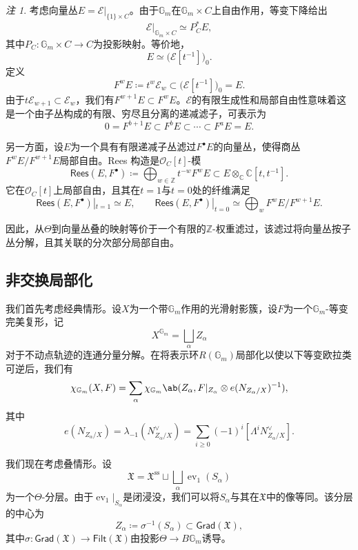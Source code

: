 \documentclass{amsart}
\theoremstyle{definition}
\theoremstyle{remark}
\newtheorem{rmk}[thm]{注}
\theoremstyle{plain}
\theoremstyle{definition}
\theoremstyle{remark}
\newcommand{\G}{\mathbb{G}}
\newcommand{\C}{\mathbb{C}}
\newcommand{\Z}{\mathbb{Z}}
\newcommand{\mc}[1]{\mathcal{#1}}
\newcommand{\mf}[1]{\mathfrak{#1}}
\newcommand{\mr}[1]{\mathrm{#1}}
\newcommand{\ms}[1]{\mathsf{#1}}
\newcommand{\1}{\mathbf{1}}
\newcommand{\2}{\mathbf{2}}
\newcommand{\3}{\mathbf{3}}
\DeclareMathOperator{\ev}{ev}
\begin{document}
\begin{rmk}
    考虑向量丛\(E=\mc{E}|_{\{1\}\times C}\)。由于\(\G_m\)在\(\G_m\times C\)上自由作用，等变下降给出
    \[
        \mc{E}|_{\G_m\times C}\simeq P_C^*E,
    \]
    其中\(P_C\colon\G_m\times C\to C\)为投影映射。等价地，
    \[
        E\simeq\big(\mc{E}[t^{-1}]\big)_0.
    \]
    定义
    \[
        F^wE\coloneqq t^w\mc{E}_w\subset\big(\mc{E}[t^{-1}]\big)_0=E.
    \]
    由于\(t\mc{E}_{w+1}\subset\mc{E}_w\)，我们有\(F^{w+1}E\subset F^wE\)。\(\mc{E}\)的有限生成性和局部自由性意味着这是一个由子丛构成的有限、穷尽且分离的递减滤子，可表示为
    \[
        0=F^{b+1}E\subset F^bE\subset\cdots\subset F^aE=E.
    \]

    另一方面，设\(E\)为一个具有有限递减子丛滤过\(F^\bullet E\)的向量丛，使得商丛\(F^wE/F^{w+1}E\)局部自由。Rees 构造是\(\mc{O}_C[t]\)-模
    \[
        \ms{Rees}(E,F^\bullet)
        \coloneqq
        \bigoplus_{w\in\Z}t^{-w}F^wE
        \subset
        E\otimes_{\C}\C[t,t^{-1}].
    \]
    它在\(\mc{O}_C[t]\)上局部自由，且其在\(t=1\)与\(t=0\)处的纤维满足
    \[
        \ms{Rees}(E,F^\bullet)|_{t=1}\simeq E,
        \qquad
        \ms{Rees}(E,F^\bullet)|_{t=0}
        \simeq
        \bigoplus_w F^wE/F^{w+1}E.
    \]
\end{rmk}

因此，从\(\Theta\)到向量丛叠的映射等价于一个有限的\(\Z\)-权重滤过，该滤过将向量丛按子丛分解，且其关联的分次部分局部自由。


\subsection{非交换局部化}%
\label{sub:Non-abelian localization}

我们首先考虑经典情形。设\(X\)为一个带\(\G_m\)作用的光滑射影簇，设\(F\)为一个\(\G_m\)-等变完美复形，记
\[
    X^{\G_m}=\bigsqcup_\alpha Z_\alpha
\]
对于不动点轨迹的连通分量分解。在将表示环\(R(\G_m)\)局部化以使以下等变欧拉类可逆后，我们有
\[
    \chi_{\G_m}(X,F)
    =
    \sum_\alpha
    \chi_{\G_m}\ab(
        Z_\alpha,
        F|_{Z_\alpha}\otimes e(N_{Z_\alpha/X})^{-1}
    ),
\]
其中
\[
    e(N_{Z_\alpha/X})
    =
    \lambda_{-1}(N_{Z_\alpha/X}^\vee)
    =
    \sum_{i\geq0}(-1)^i[\Lambda^iN_{Z_\alpha/X}^\vee].
\]

我们现在考虑叠情形。设
\[
    \mf{X}
    =
    \mf{X}^{\mr{ss}}
    \sqcup
    \bigsqcup_\alpha\ev_1(S_\alpha)
\]
为一个\(\Theta\)-分层。由于\(\ev_1|_{S_\alpha}\)是闭浸没，我们可以将\(S_\alpha\)与其在\(\mf{X}\)中的像等同。该分层的中心为
\[
    Z_\alpha\coloneqq\sigma^{-1}(S_\alpha)\subset\ms{Grad}(\mf{X}),
\]
其中\(\sigma\colon\ms{Grad}(\mf{X})\to\ms{Filt}(\mf{X})\)由投影\(\Theta\to B\G_m\)诱导。
\end{document}
